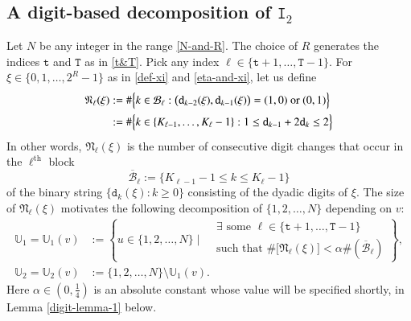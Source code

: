 \documentclass[12pt, twoside]{article}
\theoremstyle{definition}
\numberwithin{equation}{section}
\begin{document}
\subsection{A digit-based decomposition of $\mathtt I_2$}
Let $N$ be any integer in the range \eqref{N-and-R}. The choice of $R$ generates the indices $\mathtt t$ and $\mathtt T$ as in \eqref{t&T}. Pick any index $\ell \in \{\mathtt t+1, \ldots, \mathtt T-1 \}$. For $\xi \in \{0, 1, \ldots, 2^R-1\}$ as in \eqref{def-xi} and \eqref{eta-and-xi}, let us define 
\begin{equation}  \label{def-Nl}
\begin{aligned} 
\mathfrak N_{\ell}(\xi) &:= \# \Bigl\{k \in \mathcal B_{\ell} : \bigl(\mathtt d_{k-2}(\xi), \mathtt d_{k-1}(\xi) \bigr) = (1, 0) \text{ or } (0, 1) \Bigr\} \\ 
&:= \# \Bigl\{k \in \{K_{\ell-1}, \ldots, K_{\ell}-1\} : 1 \leq \mathtt d_{k-1} + 2 \mathtt d_{k} \leq 2 \Bigr\} 
\end{aligned} 
\end{equation} 
In other words, $\mathfrak N_{\ell}(\xi)$ is the number of consecutive digit changes that occur in the $\ell^{\text{th}}$ block 
\begin{equation} \label{bar-block}
\overline{\mathcal B}_{\ell} := \{K_{\ell-1} -1 \leq k \leq K_{\ell}-1 \}
\end{equation} 
of the binary string $\{\mathtt d_k(\xi) : k \geq 0\}$ consisting of the dyadic digits of $\xi$. The size of $\mathfrak N_{\ell}(\xi)$  motivates the following decomposition of $\{1, 2, \ldots, N\}$ depending on $v$:  
\begin{align} 
\mathbb U_1 = \mathbb U_1(v) &:= \left\{u \in \{1, 2, \ldots, N\}\; \Biggl| \; \begin{aligned} &\exists \text{ some } \ell \in \{\mathtt t+1, \ldots, \mathtt T-1 \} \label{def-U1} \\  &\text{such that }  \# \bigl[ \mathfrak N_{\ell}(\xi) \bigr] < \alpha \#(\overline{\mathcal B}_{\ell}) \end{aligned} \right\}, \\
\mathbb U_2 = \mathbb U_2(v) &:= \{1, 2, \ldots, N\} \setminus \mathbb U_1(v). \label{def-U2}
\end{align} 
Here $\alpha \in (0, \frac{1}{4})$ is an absolute constant whose value will be specified shortly, in Lemma \ref{digit-lemma-1} below. 
\end{document}

